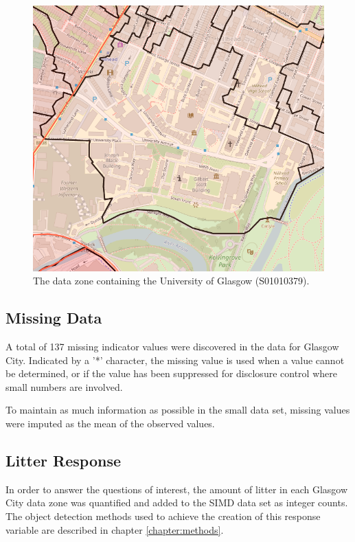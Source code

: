 \documentclass{thesis}
\begin{document}
\begin{figure}[h]
    \centering
    \includegraphics[scale=0.5]{images/glasgow-uni-ward.PNG}
    \caption{The data zone containing the University of Glasgow (S01010379).}
    \label{fig:glasgow-uni-dz}
\end{figure}

\subsection*{Missing Data}

A total of 137 missing indicator values were discovered in the data for Glasgow City. Indicated by a '*' character, the missing value is used when a value cannot be determined, or if the value has been suppressed for disclosure control where small numbers are involved.

To maintain as much information as possible in the small data set, missing values were imputed as the mean of the observed values.

\subsection*{Litter Response}

In order to answer the questions of interest, the amount of litter in each Glasgow City data zone was quantified and added to the SIMD data set as integer counts. The object detection methods used to achieve the creation of this response variable are  described in chapter \ref{chapter:methods}.
\end{document}
